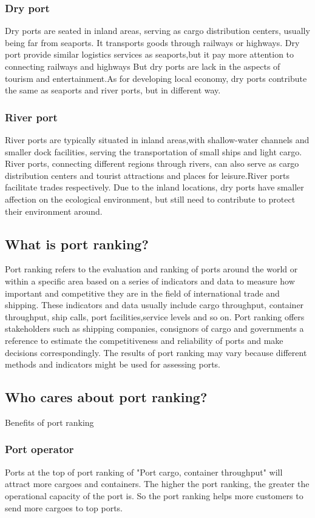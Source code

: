 \documentclass[preprint]{elsarticle}
\begin{document}
\subsubsection{Dry port}Dry ports are seated in inland areas, serving as cargo distribution centers, usually being far from seaports. It transports goods through railways or highways. Dry port provide similar logistics services as seaports,but it pay more attention to connecting railways and highways
But dry ports are lack in the aspects of tourism and entertainment.As for developing local economy, dry ports contribute the same as seaports and river ports, but in different way.

\subsubsection{River port}River ports are typically situated in inland areas,with shallow-water channels and smaller dock facilities, serving the transportation of small ships and light cargo. River ports, connecting different regions through rivers, can also serve as cargo distribution centers and tourist attractions and places for leisure.River ports facilitate trades respectively. Due to the inland locations, dry ports have smaller affection on the ecological environment, but still need to contribute to protect their environment around.
\subsection{What is port ranking?}
Port ranking refers to the evaluation and ranking of ports around the world or within a specific area based on a series of indicators and data to measure how important and competitive they are in the field of international trade and shipping. These indicators and data usually include cargo throughput, container throughput, ship calls, port facilities,service levels and so on. Port ranking offers stakeholders such as shipping companies, consignors of cargo and governments a reference to estimate the competitiveness and reliability of ports and make  decisions correspondingly. The results of port ranking may vary because different methods and indicators might be used for assessing ports.
\subsection{Who cares about port ranking?}
Benefits of port ranking

\subsubsection{Port operator}
Ports at the top of port ranking of "Port cargo, container throughput" will attract more cargoes and containers. The higher the port ranking, the greater the operational capacity of the port is. So the port ranking helps more customers to send more cargoes to top ports.
\end{document}
